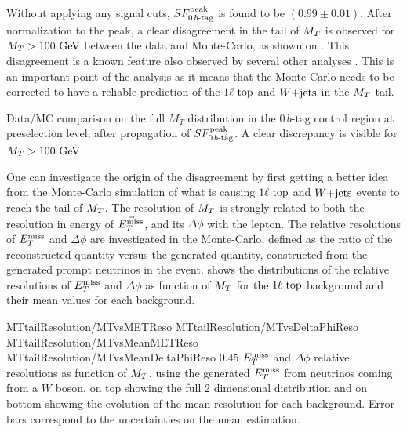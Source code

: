     Without applying any signal cuts, $SF_{0\, b\text{-tag}}^{\text{peak}}$ is found to be $(0.99 \pm
    0.01)$.  After normalization to the peak, a clear disagreement in the tail
    of $M_T$ is observed for $M_T > 100 ~\text{GeV}$ between the data and Monte-Carlo,
    as shown on . This disagreement is a
    known feature also observed by several other analyses
    \cite{WjetsDifferentialCrossSection, LeptonicMonotop, B2GttMET}. This is an
    important point of the analysis as it means that the Monte-Carlo needs to be
    corrected to have a reliable prediction of the $1\ell~\text{top}$ and $\text{$W$+jets}$
    in the $M_T$ tail.

                 {Data/MC comparison on the full $M_T$ distribution in the $0\, b\text{-tag}$ control
                 region at preselection level, after propagation of $SF_{0\, b\text{-tag}}^{\text{peak}}$. A clear
                 discrepancy is visible for $M_T > 100 ~\text{GeV}$.}

    One can investigate the origin of the disagreement by first getting a better
    idea from the Monte-Carlo simulation of what is causing $1\ell~\text{top}$ and
    $\text{$W$+jets}$ events to reach the tail of $M_T$. The resolution of $M_T$ is
    strongly related to both the resolution in energy of $\vec{E_T^\text{miss}}$, and its
    $\Delta\phi$ with the lepton. The relative resolutions of $E_T^\text{miss}$ and $\Delta
    \phi$ are investigated in the Monte-Carlo, defined as the ratio of the
    reconstructed quantity versus the generated quantity, constructed from the
    generated prompt neutrinos in the event.  shows
    the distributions of the relative resolutions of $E_T^\text{miss}$ and $\Delta \phi$ as
    function of $M_T$ for the $1\ell~\text{top}$ background and their mean values
    for each background.

                      {MTtailResolution/MTvsMETReso}
                      {MTtailResolution/MTvsDeltaPhiReso}
                      {MTtailResolution/MTvsMeanMETReso}
                      {MTtailResolution/MTvsMeanDeltaPhiReso}
                      {0.45}
                      {$E_T^\text{miss}$ and $\Delta \phi$ relative resolutions as function
                      of $M_T$, using the generated $E_T^\text{miss}$ from neutrinos coming
                      from a $W$ boson, on top showing the full 2 dimensional
                      distribution and on bottom showing the evolution of the
                      mean resolution for each background. Error bars correspond
                      to the uncertainties on the mean estimation.}

